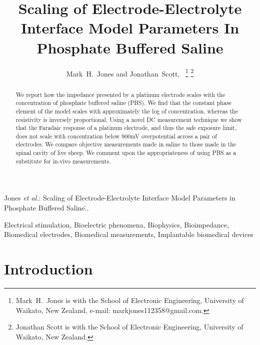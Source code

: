 \documentclass[journal, a4paper]{IEEEtran}
\begin{document}
\title{Scaling of Electrode-Electrolyte Interface Model Parameters In Phosphate Buffered Saline}

\author{Mark~H.~Jones and Jonathan~Scott,~
\thanks{Mark~H.~Jones is with the School of Electronic Engineering, University of Waikato, New Zealand, e-mail: markjones112358@gmail.com.}%
\thanks{Jonathan Scott is with the School of Electronic Engineering, University of Waikato, New Zealand.}
}

{Jones \MakeLowercase{\textit{et al.}}: Scaling of Electrode-Electrolyte Interface Model Parameters in Phosphate Buffered Saline\...}
\maketitle



\begin{abstract}

    We report how the impedance presented by a platinum electrode scales with the concentration of phosphate buffered saline (PBS).
We find that the constant phase element of the model scales with approximately the log of concentration, whereas the resistivity is inversely proportional.
Using a novel DC measurement technique we show that the Faradaic response of a platinum electrode, and thus the safe exposure limit, does not scale with concentration below 900\thinspace mV overpotential across a pair of electrodes.
We compare objective measurements made in saline to those made in the spinal cavity of live sheep. We comment upon the appropriateness of using PBS as a substitute for in-vivo measurements.
\end{abstract}

\begin{IEEEkeywords}
    Electrical stimulation, Bioelectric phenomena, Biophysics, Bioimpedance, Biomedical electrodes, Biomedical measurements, Implantable biomedical devices
\end{IEEEkeywords}




\section{Introduction}
\end{document}

